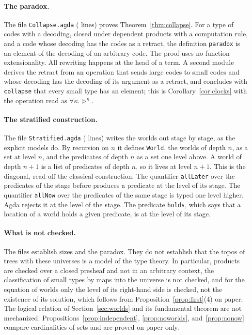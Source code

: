 \documentclass[acmsmall,nonacm,screen]{acmart}
\newcommand{\later}{{\triangleright}}
\newcommand{\agda}[1]{\texttt{#1}}
\newcommand{\claim}[2]{#2}
\begin{document}
\paragraph{The paradox.}
The file \agda{Collapse.agda} (\LinesCollapse{} lines) proves Theorem~\ref{thm:collapse}.
\claim{paradox}{For a type of codes with a decoding, closed under dependent products with a
computation rule, and a code whose decoding has the codes as a retract, the definition
\agda{paradox} is an element of the decoding of an arbitrary code.}
The proof uses no function extensionality. All rewriting happens at the head of a term.
\claim{clocks}{A second module derives the retract from an operation that sends large codes
to small codes and whose decoding has the decoding of its argument as a retract, and
concludes with \agda{collapse} that every small type has an element; this is
Corollary~\ref{cor:clocks} with the operation read as $\forall\kappa.\later^\kappa$.}

\paragraph{The stratified construction.}
The file \agda{Stratified.agda} (\LinesStratified{} lines) writes the worlds out stage by
stage, as the explicit models do.
\claim{stages}{By recursion on $n$ it defines \agda{World}, the worlds of depth $n$, as a set
at level $n$, and the predicates of depth $n$ as a set one level above.}
A world of depth $n+1$ is a list of predicates of depth $n$, so it lives at level $n+1$.
This is the diagonal, read off the classical construction.
\claim{guarded-quantifier}{The quantifier \agda{allLater} over the predicates of the stage
before produces a predicate at the level of its stage.}
\claim{plain-quantifier}{The quantifier \agda{allNow} over the predicates of the same stage is
typed one level higher.}
\claim{now-rejected}{Agda rejects it at the level of the stage.}
\claim{holds}{The predicate \agda{holds}, which says that a location of a world holds a given
predicate, is at the level of its stage.}

\paragraph{What is not checked.}
The files establish sizes and the paradox. They do not establish that the topos of trees
with these universes is a model of the type theory. In particular, products are checked
over a closed presheaf and not in an arbitrary context, the classification of small types
by maps into the universe is not checked, and for the equation of worlds only the level of
its right-hand side is checked, not the existence of its solution, which follows from
Proposition~\ref{prop:first}(4) on paper. The logical relation of
Section~\ref{sec:worlds} and its fundamental theorem are not mechanized.
Propositions~\ref{prop:independent}, \ref{prop:noworlds}, and~\ref{prop:nonow} compare
cardinalities of sets and are proved on paper only.
\end{document}
